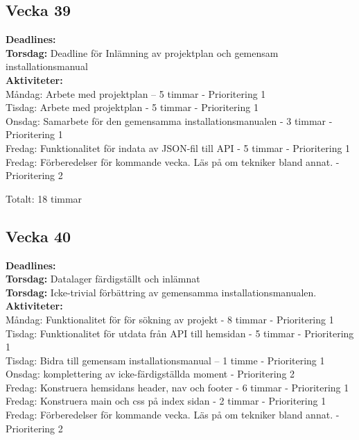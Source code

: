 \documentclass{TDP003mall}
\begin{document}
\subsection{Vecka 39}

\textbf{Deadlines:} \\
\textbf{{\color{red}Torsdag:}} Deadline för Inlämning av projektplan och gemensam installationsmanual\\

\textbf{Aktiviteter:} \\
Måndag: Arbete med projektplan – 5 timmar - Prioritering 1\\
Tisdag: Arbete med projektplan - 5 timmar - Prioritering 1 \\
Onsdag: Samarbete för den gemensamma installationsmanualen - 3 timmar - Prioritering 1\\
Fredag: Funktionalitet för indata av JSON-fil till API - 5 timmar - Prioritering 1\\
Fredag: Förberedelser för kommande vecka. Läs på om tekniker bland annat. - Prioritering 2

Totalt: 18 timmar

\subsection{Vecka 40}

\textbf{Deadlines:}\\
\textbf{{\color{red}Torsdag:}} Datalager färdigställt och inlämnat \\
\textbf{{\color{red}Torsdag:}} Icke-trivial förbättring av gemensamma installationsmanualen.\\

\textbf{Aktiviteter:} \\
Måndag: Funktionalitet för för sökning av projekt - 8 timmar - Prioritering 1\\
Tisdag: Funktionalitet för utdata från API till hemsidan - 5 timmar - Prioritering 1\\
Tisdag: Bidra till gemensam installationsmanual – 1 timme - Prioritering 1\\
Onsdag: komplettering av icke-färdigställda moment - Prioritering 2 \\
Fredag: Konstruera hemsidans header, nav och footer - 6 timmar - Prioritering 1\\
Fredag: Konstruera main och css på index sidan - 2 timmar - Prioritering 1\\
Fredag: Förberedelser för kommande vecka. Läs på om tekniker bland annat. - Prioritering 2
\end{document}
